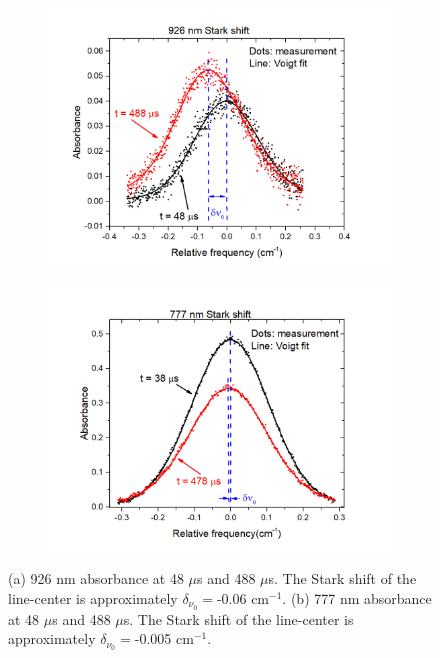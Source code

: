 \documentclass[12pt]{iopart}
\begin{document}
\begin{figure}[h]
  \centering
    \begin{subfigure}[b]{0.45\textwidth}
     \includegraphics[width=\textwidth]{lineshape_time_history_concise_926.jpg}
    \caption{\label{fig:lineshape_shift_time_history}}  
      \end{subfigure} %
    \begin{subfigure}[b]{0.45\textwidth}
     \includegraphics[width=\textwidth]{lineshape_time_history_concise_777.jpg}
      \caption{\label{fig:lineshape_shift_time_history_777} }
      \end{subfigure}
    \caption{\label{fig:lineshape_shift_time_history_777_926} (a) 926 nm absorbance at 48 $\mu$s and 488 $\mu$s. The Stark shift of the line-center is approximately $\delta_{\nu_0}=$-0.06 cm$^{-1}$. (b) 777 nm absorbance at 48 $\mu$s and 488 $\mu$s. The Stark shift of the line-center is approximately $\delta_{\nu_0}=$-0.005 cm$^{-1}$. }
\end{figure}
\end{document}

